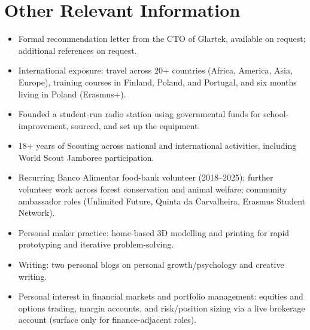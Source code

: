 \documentclass[10pt,a4paper]{article}
\begin{document}

\section{Other Relevant Information}

\begin{itemize}
\item Formal recommendation letter from the CTO of Glartek, available on request; additional references on request.
\item International exposure: travel across 20+ countries (Africa, America, Asia, Europe), training courses in Finland, Poland, and Portugal, and six months living in Poland (Erasmus+).
\item Founded a student-run radio station using governmental funds for school-improvement, sourced, and set up the equipment.
\item 18+ years of Scouting across national and international activities, including World Scout Jamboree participation.
\item Recurring Banco Alimentar food-bank volunteer (2018–2025); further volunteer work across forest conservation and animal welfare; community ambassador roles (Unlimited Future, Quinta da Carvalheira, Erasmus Student Network).
\item Personal maker practice: home-based 3D modelling and printing for rapid prototyping and iterative problem-solving.
\item Writing: two personal blogs on personal growth/psychology and creative writing.
\item Personal interest in financial markets and portfolio management: equities and options trading, margin accounts, and risk/position sizing via a live brokerage account (surface only for finance-adjacent roles).
\end{itemize}
\end{document}
